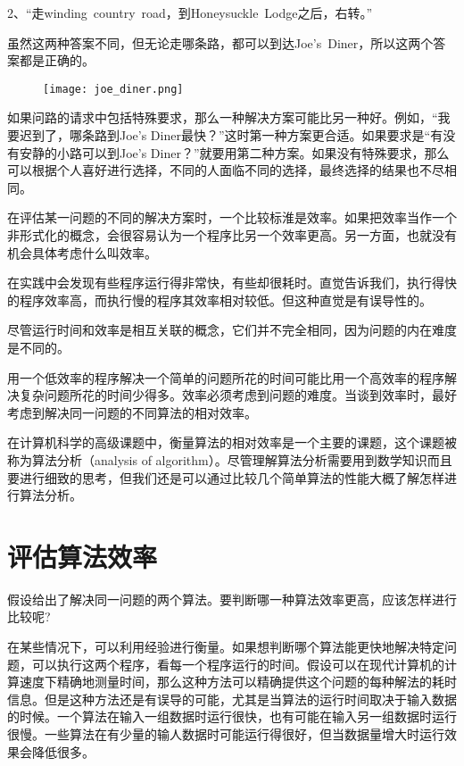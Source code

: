2、“走winding~country~road，到Honeysuckle~Lodge之后，右转。”

虽然这两种答案不同，但无论走哪条路，都可以到达Joe’s~Diner，所以这两个答案都是正确的。

\begin{figure}[!h]
\centering
\texttt{[image: joe\_diner.png]}
\end{figure}

如果问路的请求中包括特殊要求，那么一种解决方案可能比另一种好。例如，“我要迟到了，哪条路到Joe’s Diner最快？”这时第一种方案更合适。如果要求是“有没有安静的小路可以到Joe’s Diner？”就要用第二种方案。如果没有特殊要求，那么可以根据个人喜好进行选择，不同的人面临不同的选择，最终选择的结果也不尽相同。

在评估某一问题的不同的解决方案时，一个比较标淮是效率。如果把效率当作一个非形式化的概念，会很容易认为一个程序比另一个效率更高。另一方面，也就没有机会具体考虑什么叫效率。

在实践中会发现有些程序运行得非常快，有些却很耗时。直觉告诉我们，执行得快的程序效率高，而执行慢的程序其效率相对较低。但这种直觉是有误导性的。

尽管运行时间和效率是相互关联的概念，它们并不完全相同，因为问题的内在难度是不同的。

用一个低效率的程序解决一个简单的问题所花的时间可能比用一个高效率的程序解决复杂问题所花的时间少得多。效率必须考虑到问题的难度。当谈到效率时，最好考虑到解决同一问题的不同算法的相对效率。

在计算机科学的高级课题中，衡量算法的相对效率是一个主要的课题，这个课题被称为算法分析（analysis of algorithm）。尽管理解算法分析需要用到数学知识而且要进行细致的思考，但我们还是可以通过比较几个简单算法的性能大概了解怎样进行算法分析。

\section{评估算法效率}

假设给出了解决同一问题的两个算法。要判断哪一种算法效率更高，应该怎样进行比较呢?

在某些情况下，可以利用经验进行衡量。如果想判断哪个算法能更快地解决特定问题，可以执行这两个程序，看每一个程序运行的时间。假设可以在现代计算机的计算速度下精确地测量时间，那么这种方法可以精确提供这个问题的每种解法的耗时信息。但是这种方法还是有误导的可能，尤其是当算法的运行时间取决于输入数据的时候。一个算法在输入一组数据时运行很快，也有可能在输入另一组数据时运行很慢。一些算法在有少量的输人数据时可能运行得很好，但当数据量增大时运行效果会降低很多。

